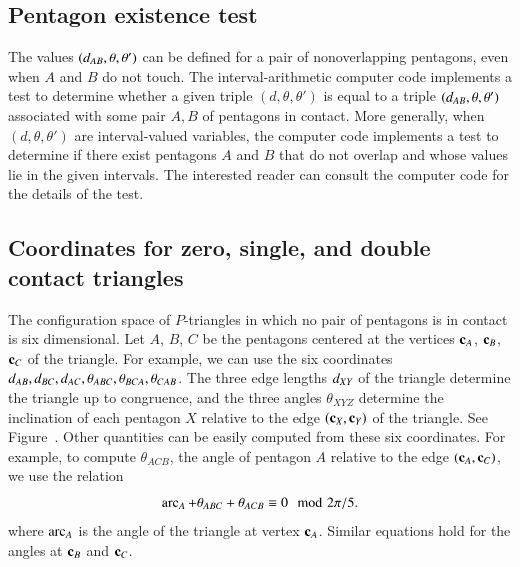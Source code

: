 \subsection{Pentagon existence test}

The values $(d_{AB},\theta,\theta')$ can be defined for a pair of
nonoverlapping pentagons, even when $A$ and $B$ do not touch.  The
interval-arithmetic computer code implements a test to determine whether a given triple
$(d,\theta,\theta')$ is equal to a triple
$(d_{AB},\theta,\theta')$ associated with some pair $A,B$ of
pentagons in contact.  More generally, when $(d,\theta,\theta')$
are interval-valued variables, the computer code implements a test to
determine if there exist pentagons $A$ and $B$ that do not overlap and
whose values lie in the given intervals.  The interested reader can
consult the computer code for the details of the test.

\subsection{Coordinates for zero, single, and double contact
  triangles}

The configuration space of $P$-triangles in which no pair of pentagons
is in contact is six dimensional.  Let $A$, $B$, $C$ be the pentagons
centered at the vertices ${\mathbf c}_A$, ${\mathbf c}_B$, ${\mathbf c}_C$ of the triangle.  For
example, we can use the six coordinates
$d_{AB},d_{BC},d_{AC},\theta_{ABC},\theta_{BCA},\theta_{CAB}$.  The
three edge lengths $d_{XY}$ of the triangle determine the triangle up
to congruence, and the three angles $\theta_{XYZ}$ determine the
inclination of each pentagon $X$ relative to the edge $({\mathbf c}_X,{\mathbf c}_Y)$ of
the triangle.  See Figure~.  Other quantities can
be easily computed from these six coordinates.  For example, to
compute $\theta_{ACB}$, the angle of pentagon $A$ relative to the edge
$({\mathbf c}_A,{\mathbf c}_C)$, we use the relation
\begin{equation}
\operatorname{arc}_A + \theta_{ABC} + \theta_{ACB} \equiv 0\mod 2\pi/5.
\end{equation}
where $\operatorname{arc}_A$ is the angle of the triangle at vertex ${\mathbf c}_A$.  
Similar equations hold for the angles at ${\mathbf c}_B$ and ${\mathbf c}_C$.


